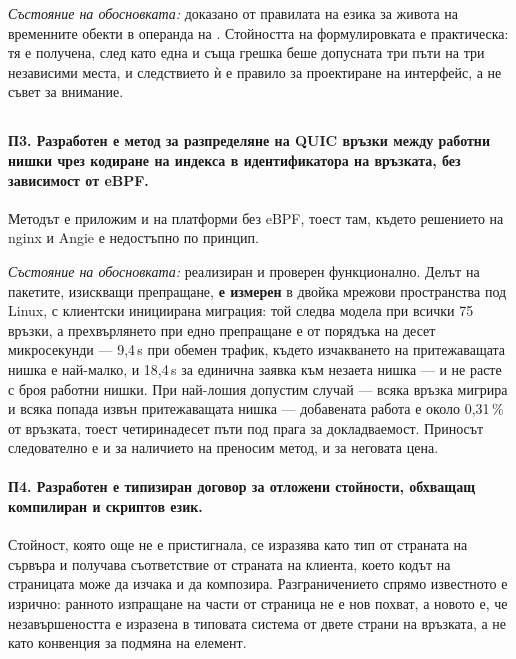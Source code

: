 \emph{Състояние на обосновката:} доказано от правилата на езика за живота на временните
обекти в операнда на . Стойността на формулировката е практическа: тя е
получена, след като една и съща грешка беше допусната три пъти на три независими места, и
следствието ѝ е правило за проектиране на интерфейс, а не съвет за внимание.

\subsection*{}

\paragraph{П3. Разработен е метод за разпределяне на QUIC връзки между работни нишки чрез
кодиране на индекса в идентификатора на връзката, без зависимост от eBPF.}
Методът е приложим и на платформи без eBPF, тоест там, където решението на nginx и Angie е
недостъпно по принцип.

\emph{Състояние на обосновката:} реализиран и проверен функционално. Делът на пакетите,
изискващи препращане, \textbf{е измерен} в двойка мрежови пространства под Linux, с клиентски
инициирана миграция: той следва модела при всички 75 връзки, а прехвърлянето при едно препращане е от порядъка на десет микросекунди — 9,4\,\textmu s при
обемен трафик, където изчакването на притежаващата нишка е най-малко, и 18,4\,\textmu s за
единична заявка към незаета нишка — и не расте с броя работни нишки.
При най-лошия допустим случай — всяка връзка мигрира и всяка попада извън притежаващата нишка —
добавената работа е около 0,31\,\% от връзката, тоест четиринадесет пъти под прага за
докладваемост. Приносът следователно е и за наличието на преносим метод, и за неговата цена.

\paragraph{П4. Разработен е типизиран договор за отложени стойности, обхващащ компилиран и
скриптов език.}
Стойност, която още не е пристигнала, се изразява като тип от страната на сървъра и получава
съответствие от страната на клиента, което кодът на страницата може да изчака и да композира.
Разграничението спрямо известното е изрично: ранното изпращане на части от страница не е нов
похват, а новото е, че незавършеността е изразена в типовата система от двете страни на
връзката, а не като конвенция за подмяна на елемент.

